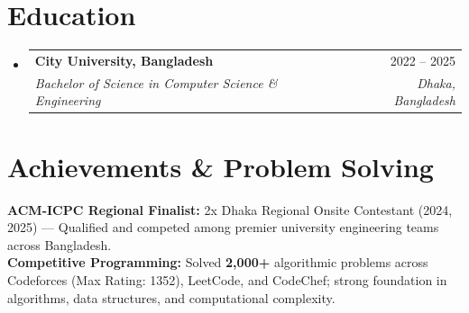 \documentclass[letterpaper,10pt]{article}
\makeatletter
\newcommand{\resumeSubheading}[4]{
  \vspace{-2pt}\item
    \begin{tabular*}{\textwidth}[t]{l@{\extracolsep{\fill}}r}
      \textbf{#1} & \small#2 \\
      \textit{\small#3} & \textit{\small#4} \\
    \end{tabular*}\vspace{-5pt}
}
\newcommand{\resumeSubHeadingListStart}{\begin{itemize}[leftmargin=0.0in, label={}]}
\newcommand{\resumeSubHeadingListEnd}{\end{itemize}\vspace{-4pt}}
\makeatother
\begin{document}
\section{Education}
\resumeSubHeadingListStart
  \resumeSubheading
    {City University, Bangladesh}{2022 -- 2025}
    {Bachelor of Science in Computer Science \& Engineering}{Dhaka, Bangladesh}
\resumeSubHeadingListEnd

\section{Achievements \& Problem Solving}
\begin{itemize}[leftmargin=0.0in, label={}]
  \small{\item{
    \textbf{ACM-ICPC Regional Finalist:}{ 2x Dhaka Regional Onsite Contestant (2024, 2025) --- Qualified and competed among premier university engineering teams across Bangladesh.} \\[2.5pt]
    \textbf{Competitive Programming:}{ Solved \textbf{2,000+} algorithmic problems across Codeforces (Max Rating: 1352), LeetCode, and CodeChef; strong foundation in algorithms, data structures, and computational complexity.}
  }}
\end{itemize}

\end{document}
